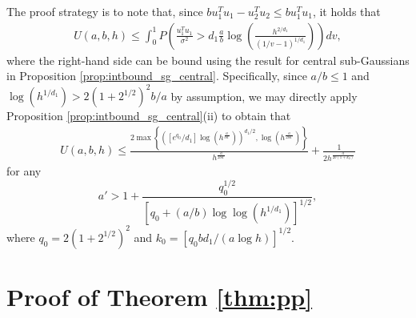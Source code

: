 The proof strategy is to note that, since $b u_1^Tu_1 - u_2^Tu_2 \leq b u_1^Tu_1$, it holds that
\begin{align}
 U(a,b,h) \leq \int_0^1 P \left( \frac{u_1^Tu_1}{\sigma^2} > d_1 \frac{a}{b} \log \left( \frac{h^{2/d_1}}{(1/v-1)^{1/d_1}} \right) \right) dv,
\nonumber
\end{align}
where the right-hand side can be bound using the result for central sub-Gaussians in Proposition \ref{prop:intbound_sg_central}.
Specifically, since $a/b \leq 1$ and $\log(h^{1/d_1}) > 2(1+2^{1/2})^2 b/a$ by assumption, we may directly apply Proposition \ref{prop:intbound_sg_central}(ii) to obtain that
\begin{align}
 U(a,b,h) \leq \frac{2 \max \left\{([e^{q_0}/d_1] \log(h^{\frac{a}{b a'}}))^{d_1/2}  , \log(h^{\frac{a}{2b a'}}) \right\}}{h^{\frac{a}{2b a'}}}
+ \frac{1}{2 h^{\frac{a}{2b(1+k_0)}}}
\nonumber
\end{align}
for any 
$$
a'> 1 + \frac{q_0^{1/2}}{[q_0 + (a/b) \log \log (h^{1/d_1})]^{1/2}},
$$
where $q_0= 2(1+2^{1/2})^2$ and $k_0= [q_0b d_1/(a \log h)]^{1/2}$.





\newpage
\section{Proof of Theorem \ref{thm:pp}}
\label{supplsec:proof_pp}


